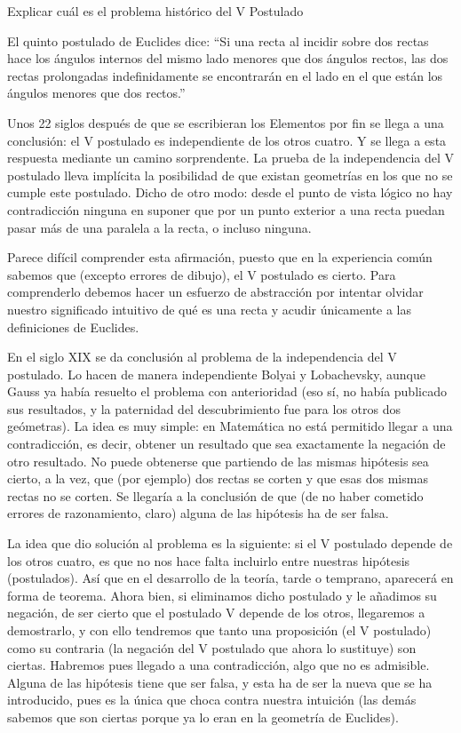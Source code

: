 \begin{problem}[21]
Explicar cuál es el problema histórico del V Postulado
\solution

El quinto postulado de Euclides dice: ``Si una recta al incidir sobre dos rectas hace los ángulos internos del mismo lado menores que dos ángulos rectos, las dos rectas prolongadas indefinidamente se encontrarán en el lado en el que están los ángulos menores que dos rectos.''

Unos 22 siglos después de que se escribieran los Elementos por fin se llega a una conclusión: el V postulado es independiente de los otros cuatro. Y se llega a esta respuesta mediante un camino sorprendente. La prueba de la independencia del V postulado lleva implícita la posibilidad de que existan geometrías en los que no se cumple este postulado. Dicho de otro modo: desde el punto de vista lógico no hay contradicción ninguna en suponer que por un punto exterior a una recta puedan pasar más de una paralela a la recta, o incluso ninguna.

Parece difícil comprender esta afirmación, puesto que en la experiencia común sabemos que (excepto errores de dibujo), el V postulado es cierto. Para comprenderlo debemos hacer un esfuerzo de abstracción por intentar olvidar nuestro significado intuitivo de qué es una recta y acudir únicamente a las definiciones de Euclides.

En el siglo XIX se da conclusión al problema de la independencia del V postulado. Lo hacen de manera independiente Bolyai y Lobachevsky, aunque Gauss ya había resuelto el problema con anterioridad (eso sí, no había publicado sus resultados, y la paternidad del descubrimiento fue para los otros dos geómetras). La idea es muy simple: en Matemática no está permitido llegar a una contradicción, es decir, obtener un resultado que sea exactamente la negación de otro resultado. No puede obtenerse que partiendo de las mismas hipótesis sea cierto, a la vez, que (por ejemplo) dos rectas se corten y que esas dos mismas rectas no se corten. Se llegaría a la conclusión de que (de no haber cometido errores de razonamiento, claro) alguna de las hipótesis ha de ser falsa.

La idea que dio solución al problema es la siguiente: si el V postulado depende de los otros cuatro, es que no nos hace falta incluirlo entre nuestras hipótesis (postulados). Así que en el desarrollo de la teoría, tarde o temprano, aparecerá en forma de teorema. Ahora bien, si eliminamos dicho postulado y le añadimos su negación, de ser cierto que el postulado V depende de los otros, llegaremos a demostrarlo, y con ello tendremos que tanto una proposición (el V postulado) como su contraria (la negación del V postulado que ahora lo sustituye) son ciertas. Habremos pues llegado a una contradicción, algo que no es admisible. Alguna de las hipótesis tiene que ser falsa, y esta ha de ser la nueva que se ha introducido, pues es la única que choca contra nuestra intuición (las demás sabemos que son ciertas porque ya lo eran en la geometría de Euclides).


\end{problem}
